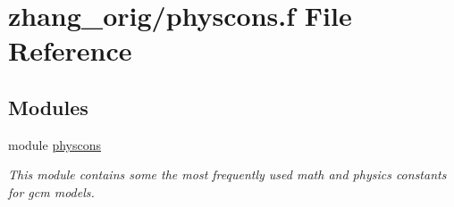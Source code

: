 \hypertarget{physcons_8f}{}\section{zhang\+\_\+orig/physcons.f File Reference}
\label{physcons_8f}
\subsection*{Modules}
\begin{DoxyCompactItemize}
\item 
module \hyperlink{namespacephyscons}{physcons}
\begin{DoxyCompactList}\small\item\em This module contains some the most frequently used math and physics constants for gcm models. \end{DoxyCompactList}\end{DoxyCompactItemize}
